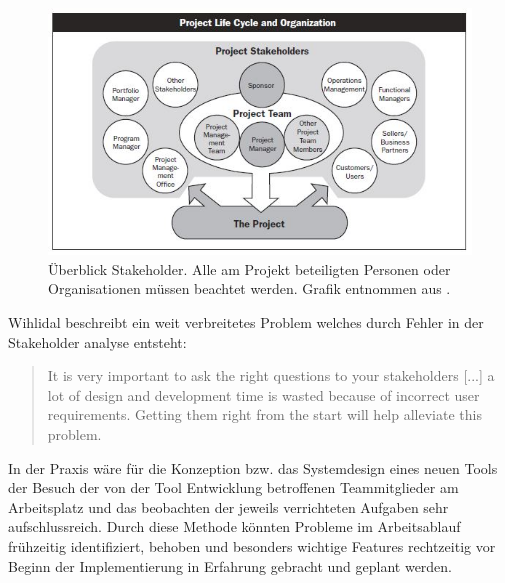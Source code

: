 \documentclass[pagesize, paper=a4, fontsize=12pt, titlepage=true, headings=small, headnosepline, abstractoff, liststotoc, nochapterprefix, plainheadsepline, twoside]{scrreprt}
\begin{document}
\begin{figure}[ht]
	\centering
	\includegraphics[width=\linewidth]{Bilder/Stakeholder_Uebersicht.jpg}
	\caption{Überblick Stakeholder. Alle am Projekt beteiligten Personen oder Organisationen müssen beachtet werden. Grafik entnommen aus \autocite[S. 24]{PMBOK}.}
	\label{StakeholderÜbersicht}
\end{figure}

Wihlidal beschreibt ein weit verbreitetes Problem welches durch Fehler in der Stakeholder analyse entsteht:
\begin{quote}
It is very important to ask the right questions to your stakeholders [...] a lot of design and development time is wasted because of incorrect user requirements. Getting them right from the start will help alleviate this problem.
\autocite[S. 28]{Wihlidal2006}
\end{quote}

In der Praxis wäre für die Konzeption bzw. das Systemdesign eines neuen Tools der Besuch der von der Tool Entwicklung betroffenen Teammitglieder am Arbeitsplatz und das beobachten der jeweils verrichteten Aufgaben sehr aufschlussreich. Durch diese Methode könnten Probleme im Arbeitsablauf frühzeitig identifiziert, behoben und besonders wichtige Features rechtzeitig vor Beginn der Implementierung in Erfahrung gebracht und geplant werden.
\end{document}
